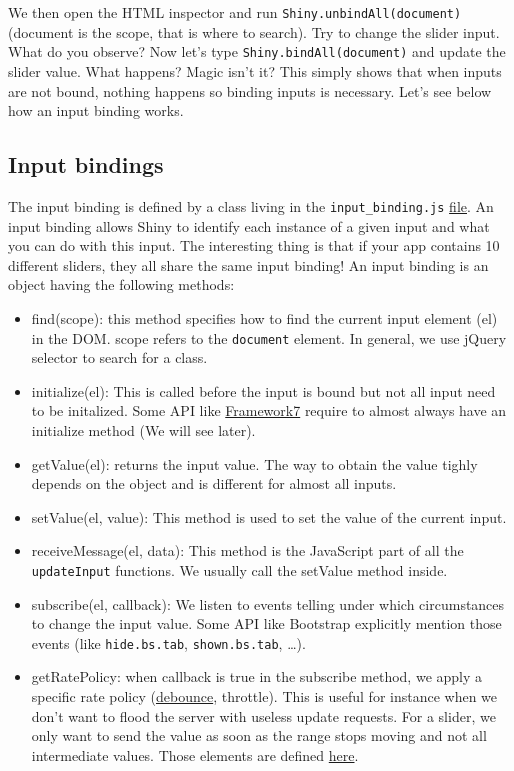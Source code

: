 \documentclass[]{book}
\providecommand{\tightlist}{%
  \setlength{\itemsep}{0pt}\setlength{\parskip}{0pt}}
\begin{document}
We then open the HTML inspector and run \texttt{Shiny.unbindAll(document)} (document is the scope, that is where to search). Try to change the slider input. What do you observe? Now let's type \texttt{Shiny.bindAll(document)} and update the slider value. What happens? Magic isn't it? This simply shows that when inputs are not bound, nothing happens so binding inputs is necessary. Let's see below how an input binding works.

\hypertarget{input-bindings}{%
\subsection{Input bindings}\label{input-bindings}}

The input binding is defined by a class living in the \texttt{input\_binding.js} \href{https://github.com/rstudio/shiny/blob/master/srcjs/input_binding.js}{file}.
An input binding allows Shiny to identify each instance of a given input and what you can do with this input. The interesting thing is that if your app contains 10 different sliders, they all share the same input binding! An input binding is an object having the following methods:

\begin{itemize}
\tightlist
\item
  find(scope): this method specifies how to find the current input element (el) in the DOM. scope refers to the \texttt{document} element. In general, we use jQuery selector to search for a class.
\item
  initialize(el): This is called before the input is bound but not all input need to be initalized. Some API like \href{https://framework7.io}{Framework7} require to almost always have an initialize method (We will see later).
\item
  getValue(el): returns the input value. The way to obtain the value tighly depends on the object and is different for almost all inputs.
\item
  setValue(el, value): This method is used to set the value of the current input.
\item
  receiveMessage(el, data): This method is the JavaScript part of all the \texttt{updateInput} functions. We usually call the setValue method inside.
\item
  subscribe(el, callback): We listen to events telling under which circumstances to change the input value. Some API like Bootstrap explicitly mention those events (like \texttt{hide.bs.tab}, \texttt{shown.bs.tab}, \ldots{}).
\item
  getRatePolicy: when callback is true in the subscribe method, we apply a specific rate policy (\href{https://davidwalsh.name/javascript-debounce-function}{debounce}, throttle). This is useful for instance when we don't want to flood the server with useless update requests. For a slider, we only want to send the value as soon as the range stops moving and not all intermediate values. Those elements are defined \href{https://github.com/rstudio/shiny/blob/master/srcjs/input_rate.js}{here}.
\end{itemize}
\end{document}
